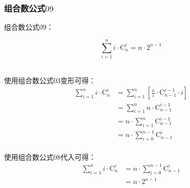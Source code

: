 \documentclass[UTF8]{ctexart}
\begin{document}
\subsubsection{组合数公式$09$}
    组合数公式$09$：
    \begin{large}
        \begin{equation*}
            \sum_{i=1}^{n}i\cdot\mathrm{C}_n^i=n\cdot 2^{n-1}
        \end{equation*}
    \end{large}\\
    使用组合数公式$03$变形可得：
    \setcounter{equation}{0}
    \begin{align}
        \sum_{i=1}^{n}i\cdot\mathrm{C}_n^i
        &=\sum_{i=1}^{n}\left[\frac{n}{i}\cdot\mathrm{C}_{n-1}^{i-1}\cdot i\right]\\[3mm]
        &=\sum_{i=1}^{n}n\cdot\mathrm{C}_{n-1}^{i-1}\\[3mm]
        &=n\cdot\sum_{i=1}^{n}\mathrm{C}_{n-1}^{i-1}\\[3mm]
        &=n\cdot\sum_{i=0}^{n-1}\mathrm{C}_{n-1}^{i}
    \end{align}\\
    使用组合数公式$08$代入可得：
    \begin{align}
        \sum_{i=1}^{n}i\cdot\mathrm{C}_n^i
        &=n\cdot\sum_{i=0}^{n-1}\mathrm{C}_{n-1}^{i}\\[3mm]
        &=n\cdot 2^{n-1}
    \end{align}

\newpage
\end{document}
